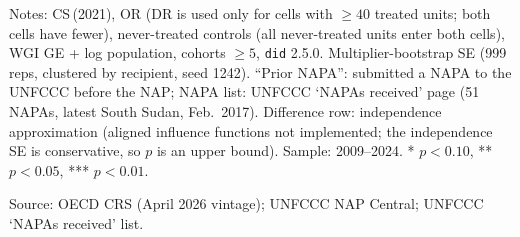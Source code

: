 \begin{table}[H]
\centering
\caption{NAP effect by prior NAPA submission status}
\label{tab:prior_napa_split}
\par\vspace{4pt}
\begin{minipage}{\linewidth}\footnotesize
Notes: CS\,(2021), OR (DR is used only for cells with $\geq 40$ treated units; both cells have fewer), never-treated controls (all never-treated units enter both cells), WGI GE + log population, cohorts $\geq 5$, \texttt{did} 2.5.0. Multiplier-bootstrap SE (999 reps, clustered by recipient, seed 1242). ``Prior NAPA'': submitted a NAPA to the UNFCCC before the NAP; NAPA list: UNFCCC `NAPAs received' page (51 NAPAs, latest South Sudan, Feb.\ 2017). Difference row: independence approximation (aligned influence functions not implemented; the independence SE is conservative, so $p$ is an upper bound). Sample: 2009--2024. * $p<0.10$, ** $p<0.05$, *** $p<0.01$.\par
Source: OECD CRS (April 2026 vintage); UNFCCC NAP Central; UNFCCC `NAPAs received' list.
\end{minipage}
\end{table}
